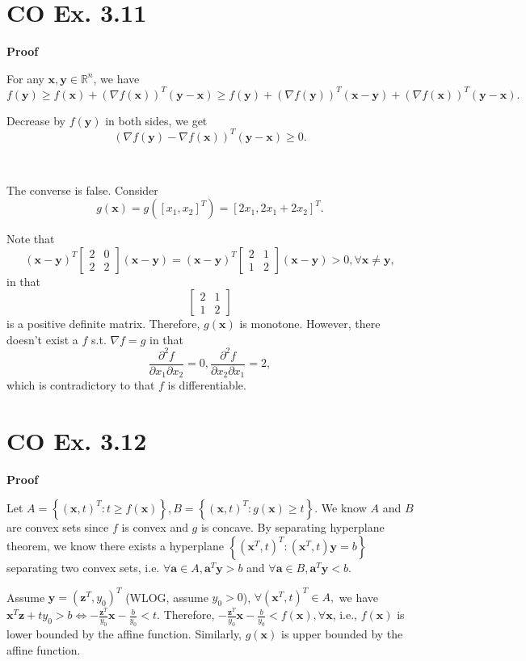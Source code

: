 \documentclass[12pt]{article}
\begin{document}
\section*{CO Ex. 3.11}
\textbf{Proof}

For any $\bm{x},\bm{y}\in\mathbb{R}^n$, we have $$f(\bm{y})\ge f(\bm{x})+(\nabla f(\bm{x}))^T(\bm{y}-\bm{x})\ge f(\bm{y})+(\nabla f(\bm{y}))^T(\bm{x}-\bm{y})+(\nabla f(\bm{x}))^T(\bm{y}-\bm{x}).$$

Decrease by $f(\bm{y})$ in both sides, we get $$(\nabla f(\bm{y})-\nabla f(\bm{x}))^T(\bm{y}-\bm{x})\ge 0.$$

~

The converse is false. Consider $$g(\bm{x})=g([x_1, x_2]^T)=[2x_1, 2x_1+2x_2]^T.$$

Note that $$(\bm{x}-\bm{y})^T\left[\begin{matrix} 2 & 0 \\ 2 & 2 \end{matrix}\right](\bm{x}-\bm{y})=(\bm{x}-\bm{y})^T\left[\begin{matrix} 2 & 1 \\ 1 & 2 \end{matrix}\right](\bm{x}-\bm{y})>0,\forall \bm{x}\ne\bm{y},$$ in that $$\left[\begin{matrix} 2 & 1 \\ 1 & 2 \end{matrix}\right]$$ is a positive definite matrix. Therefore, $g(\bm{x})$ is monotone. However, there doesn't exist a $f$ s.t. $\nabla f=g$ in that $$\dfrac{\partial^2 f}{\partial x_1\partial x_2}=0,\dfrac{\partial^2 f}{\partial x_2\partial x_1}=2,$$ which is contradictory to that $f$ is differentiable.

\section*{CO Ex. 3.12}
\textbf{Proof}

Let $A=\left\{(\bm{x},t)^T:t\ge f(\bm{x})\right\},B=\left\{(\bm{x},t)^T:g(\bm{x})\ge t\right\}.$ We know $A$ and $B$ are convex sets since $f$ is convex and $g$ is concave. By separating hyperplane theorem, we know there exists a hyperplane $\left\{(\bm{x}^T,t)^T:(\bm{x}^T,t)\bm{y}=b\right\}$ separating two convex sets, i.e. $\forall \bm{a}\in A, \bm{a}^T\bm{y}>b$ and $\forall \bm{a}\in B,\bm{a}^T\bm{y}<b$.

Assume $\bm{y}=(\bm{z}^T,y_0)^T$ (WLOG, assume $y_0>0$), $\forall (\bm{x}^T,t)^T\in A,$ we have $\bm{x}^T\bm{z}+ty_0>b\Leftrightarrow -\frac{\bm{z}^T}{y_0}\bm{x}-\frac{b}{y_0}<t$. Therefore, $-\frac{\bm{z}^T}{y_0}\bm{x}-\frac{b}{y_0}<f(\bm{x}),\forall\bm{x}$, i.e., $f(\bm{x})$ is lower bounded by the affine function. Similarly, $g(\bm{x})$ is upper bounded by the affine function.
\end{document}
